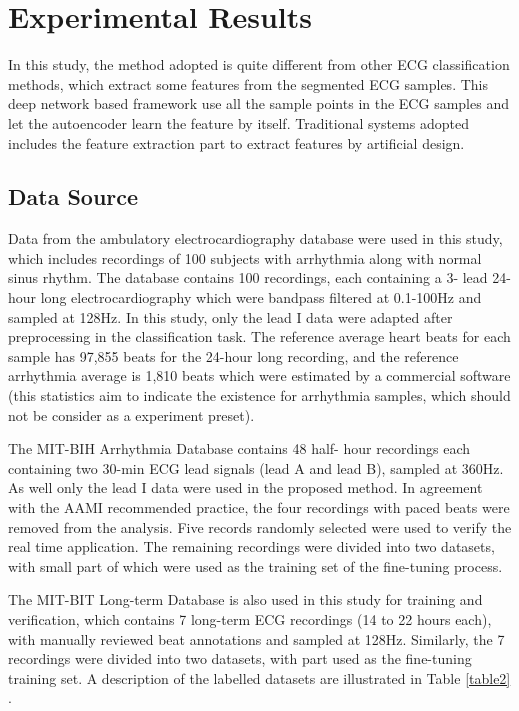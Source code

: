 \documentclass[journal]{IEEEtran}
\begin{document}
\section{Experimental Results}

In this study, the method adopted is quite different from other ECG classification methods, which extract some features from the segmented ECG samples. This deep network based framework use all the sample points in the ECG samples and let the autoencoder learn the feature by itself.  Traditional systems adopted includes the feature extraction part to extract features by artificial design.

\subsection{Data Source}
Data from the ambulatory electrocardiography database were used in this study, which includes recordings of 100 subjects with arrhythmia along with normal sinus rhythm. The database contains 100 recordings, each containing a 3- lead 24-hour long electrocardiography which were bandpass filtered at 0.1-100Hz and sampled at 128Hz. In this study, only the lead I data were adapted after preprocessing in the classification task. The reference average heart beats for each sample has 97,855 beats for the 24-hour long recording, and the reference arrhythmia average is 1,810 beats which were estimated by a commercial software (this statistics aim to indicate the existence for arrhythmia samples, which should not be consider as a experiment preset).

The MIT-BIH Arrhythmia Database \cite{physionet} contains 48 half- hour recordings each containing two 30-min ECG lead signals (lead A and lead B), sampled at 360Hz. As well only the lead I data were used in the proposed method. In agreement with the AAMI recommended practice, the four recordings with paced beats were removed from the analysis. Five records randomly selected were used to verify the real time application. The remaining recordings were divided into two datasets, with small part of which were used as the training set of the fine-tuning process.

The MIT-BIT Long-term Database is also used in this study for training and verification, which contains 7 long-term ECG recordings (14 to 22 hours each), with manually reviewed beat annotations and sampled at 128Hz. Similarly, the 7 recordings were divided into two datasets, with part used as the fine-tuning training set. A description of the labelled datasets are illustrated in Table  \ref{table2} .
\end{document}
